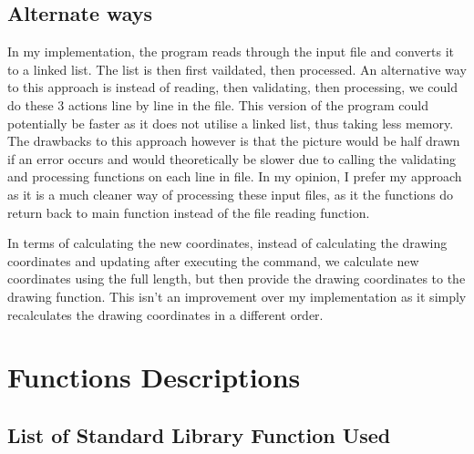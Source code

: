 \documentclass[a4paper, 12pt, titlepage]{article}
\begin{document}
\subsection{Alternate ways}

In my implementation, the program reads through the input file and converts 
it to a linked list. The list is then first vaildated, then processed. An 
alternative way to this approach is instead of reading, then validating, 
then processing, we could do these 3 actions line by line in the file. 
This version of the program could potentially be faster as it does not 
utilise a linked list, thus taking less memory. The drawbacks to this 
approach however is that the picture would be half drawn if an error occurs 
and would theoretically be slower due to calling the validating and 
processing functions on each line in file. In my opinion, I prefer my 
approach as it is a much cleaner way of processing these input files, as 
it the functions do return back to main function instead of the file reading 
function.

In terms of calculating the new coordinates, instead of calculating the 
drawing coordinates and updating after executing the command, we calculate 
new coordinates using the full length, but then provide the drawing 
coordinates to the drawing function. This isn't an improvement over my 
implementation as it simply recalculates the drawing coordinates in a 
different order.

\newpage


\section{Functions Descriptions}

\subsection{List of Standard Library Function Used}
\end{document}
